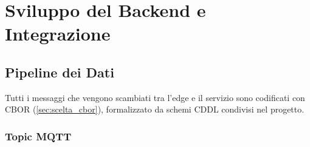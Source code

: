 \chapter{Sviluppo del Backend e Integrazione}

\section{Pipeline dei Dati}
Tutti i messaggi che vengono scambiati tra l'edge e il servizio sono codificati con CBOR (\ref{sec:scelta_cbor}), formalizzato da schemi CDDL \cite{birkholz2019cddl} condivisi nel progetto.

\subsection{Topic MQTT}

